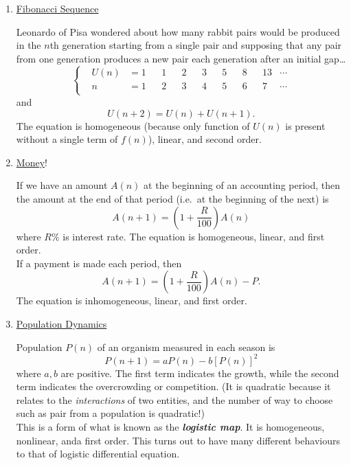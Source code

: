\documentclass[12pt]{report}
\theoremstyle{definition}
\begin{document}
\begin{ex}
    \;

    \begin{enumerate}[label = (\alph*)]
        \item \underline{Fibonacci Sequence}

            Leonardo of Pisa wondered about how many rabbit pairs would be produced in the $n$th generation
            starting from a single pair and supposing that any pair from one generation produces a new pair
            each generation after an initial gap\ldots\[
                \left\{\begin{align*}
                    & U(n) & = 1 && 1 && 2 && 3 && 5 && 8 && 13 & \cdots \\
                    & n    & = 1 && 2 && 3 && 4 && 5 && 6 && 7  & \cdots \\
                \end{align*}\right.
            \]and\[
                    U(n + 2) = U(n) + U(n + 1).
                \]The equation is homogeneous (because only function of $U(n)$ is present 
                without a single term of $f(n)$), linear, and second order.

            \item \underline{Money}!

                If we have an amount $A(n)$ at the beginning of an accounting period,
                then the amount at the end of that period (i.e.\ at the beginning of the next)
                is \[
                    A(n+1) = (1 + \frac{R}{100}) A(n)
                \]where $R\%$ is interest rate.
                The equation is homogeneous, linear, and first order.
                \smallskip
                \\If a payment is made each period, then\[
                    A(n + 1) = (1 + \frac{R}{100}) A(n) - P.
                \]The equation is inhomogeneous, linear, and first order.

            \item \underline{Population Dynamics}

                Population $P(n)$ of an organism measured in each season is\[
                    P(n+1) = aP(n) - b{[P(n)]}^{2}
                \]where $a, b$ are positive. The first term indicates the growth,
                while the second term indicates the overcrowding or competition.
                (It is quadratic because it relates to the \emph{interactions} of two entities, 
                and the number of way to choose such as pair from a population is quadratic!)
                \smallskip
                \\This is a form of what is known as the \textbf{\emph{logistic map}}.
                It is homogeneous, nonlinear, anda first order.
                This turns out to have many different behaviours to that of logistic differential equation.
    \end{enumerate}
\end{ex}
\end{document}
